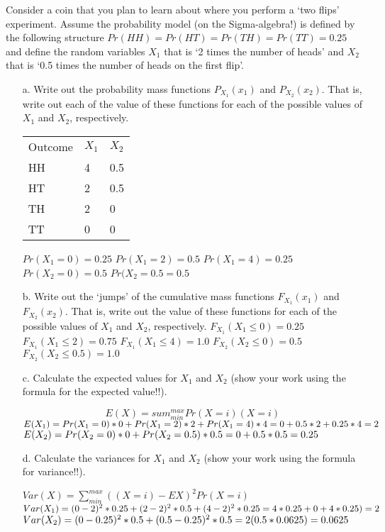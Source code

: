 \documentclass[letterpaper, 11pt]{article}
\begin{document}
Consider a coin that you plan to learn about where you perform a `two flips' experiment.  Assume the probability model (on the Sigma-algebra!) is defined by the following structure $Pr(HH)=Pr(HT)=Pr(TH)=Pr(TT)=0.25$ and define the random variables $X_1$ that is `2 times the number of heads' and $X_2$ that is `0.5 times the number of heads on the first flip'. 

\begin{itemize}

\item[a.] Write out the probability mass functions $P_{X_1}(x_1)$ and $P_{X_2}(x_2)$.  That is, write out each of the value of these functions for each of the possible values of $X_1$ and $X_2$, respectively.
\begin{table}[]
\begin{tabular}{lll}
Outcome & $X_1$ & $X_2$  \\
HH      & 4  & 0.5 \\
HT      & 2  & 0.5 \\
TH      & 2  & 0   \\
TT      & 0  & 0  
\end{tabular}
\end{table}

$Pr(X_1 = 0) = 0.25$
$Pr(X_1 = 2) = 0.5$
$Pr(X_1 = 4) = 0.25$
$Pr(X_2 = 0) =0.5$
$Pr(X_2 = 0.5 = 0.5$
\item[b.] Write out the `jumps' of the cumulative mass functions $F_{X_1}(x_1)$ and $F_{X_2}(x_2)$.  That is, write out the value of these functions for each of the possible values of $X_1$ and $X_2$, respectively.
$F_{X_1}(X_1 \leq 0) = 0.25$
$F_{X_1}(X_1 \leq 2) = 0.75$
$F_{X_1}(X_1 \leq 4) = 1.0$
$F_{X_2}(X_2 \leq 0) = 0.5$
$F_{X_2}(X_2 \leq 0.5) = 1.0$

\item[c.] Calculate the expected values for $X_1$ and $X_2$ (show your work using the formula for the expected value!!).

$$E(X) = sum_{min} ^ {max} Pr(X = i)(X=i)$$
$ E(X_1) = Pr(X_1 = 0)*0 + Pr(X_1=2)*2 + Pr(X_1 = 4) *4 \\
= 0 + 0.5*2 + 0.25*4 = 2$
$ E(X_2) = Pr(X_2 = 0) *0 + Pr(X_2 = 0.5) * 0.5 \\
= 0 + 0.5*0.5
= 0.25 $

\item[d.] Calculate the variances for $X_1$ and $X_2$ (show your work using the formula for variance!!).

$Var(X) = \sum_{min} ^ {max} ((X = i) - EX)^2Pr(X = i)$
$Var(X_1) = (0-2)^2*0.25 + (2-2)^2 *0.5 + (4-2)^2*0.25 \\
= 4*0.25 + 0 + 4*0.25) \\
= 2$
$Var(X_2) = (0-0.25)^2*0.5+ (0.5-0.25)^2*0.5 \\
= 2(0.5*0.0625)\\
= 0.0625$


\end{itemize}
\end{document}
